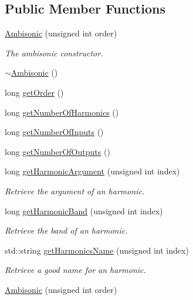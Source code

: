 \subsection*{Public Member Functions}
\begin{DoxyCompactItemize}
\item 
\hyperlink{class_hoa3_d_1_1_ambisonic_a43f91832422c0b59f92f02978dc1e541}{Ambisonic} (unsigned int order)
\begin{DoxyCompactList}\small\item\em The ambisonic constructor. \end{DoxyCompactList}\item 
\hyperlink{class_hoa3_d_1_1_ambisonic_a082fc2e3f9910703ddb49b9a478329bf}{$\sim$\-Ambisonic} ()
\item 
long \hyperlink{class_hoa3_d_1_1_ambisonic_a677405a1c3aa359753bd675d4614e7da}{get\-Order} ()
\item 
long \hyperlink{class_hoa3_d_1_1_ambisonic_aa9d613f38e6876326201995a5a415410}{get\-Number\-Of\-Harmonics} ()
\item 
long \hyperlink{class_hoa3_d_1_1_ambisonic_af03625afb9f21ef3574eafa8501129b4}{get\-Number\-Of\-Inputs} ()
\item 
long \hyperlink{class_hoa3_d_1_1_ambisonic_a126ed3be1aa3d155f56ca75ca3d69de5}{get\-Number\-Of\-Outputs} ()
\item 
long \hyperlink{class_hoa3_d_1_1_ambisonic_a3acaabfd013671c94e057e23eea1d068}{get\-Harmonic\-Argument} (unsigned int index)
\begin{DoxyCompactList}\small\item\em Retrieve the argument of an harmonic. \end{DoxyCompactList}\item 
long \hyperlink{class_hoa3_d_1_1_ambisonic_a06ecceb7aef44cd7008fd8beaf8cf33e}{get\-Harmonic\-Band} (unsigned int index)
\begin{DoxyCompactList}\small\item\em Retrieve the band of an harmonic. \end{DoxyCompactList}\item 
std\-::string \hyperlink{class_hoa3_d_1_1_ambisonic_a1b4578538f4fd0d311102b2f3ec4dac6}{get\-Harmonics\-Name} (unsigned int index)
\begin{DoxyCompactList}\small\item\em Retrieve a good name for an harmonic. \end{DoxyCompactList}\item 
\hyperlink{class_hoa3_d_1_1_ambisonic_a34736bb8f9bb34ad4a3844258bbac2fd}{Ambisonic} (unsigned int order)

\end{DoxyCompactItemize}
